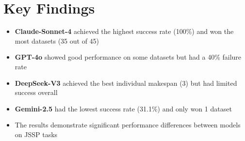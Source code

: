 \documentclass{article}
\begin{document}
\section{Key Findings}

\begin{itemize}
\item \textbf{Claude-Sonnet-4} achieved the highest success rate (100\%) and won the most datasets (35 out of 45)
\item \textbf{GPT-4o} showed good performance on some datasets but had a 40\% failure rate
\item \textbf{DeepSeek-V3} achieved the best individual makespan (3) but had limited success overall
\item \textbf{Gemini-2.5} had the lowest success rate (31.1\%) and only won 1 dataset
\item The results demonstrate significant performance differences between models on JSSP tasks
\end{itemize}
\end{document}
